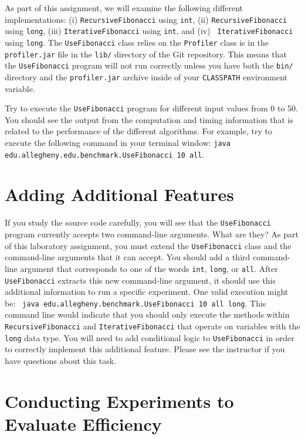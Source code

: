 \begin{sloppypar}
As part of this assignment, we will examine the following different implementations: (i) {\tt RecursiveFibonacci} using
{\tt int}, (ii) {\tt RecursiveFibonacci} using {\tt long}, (iii) {\tt IterativeFibonacci} using {\tt int}, and (iv) {\tt
  IterativeFibonacci} using {\tt long}. The {\tt UseFibonacci} class relies on the {\tt Profiler} class is in the {\tt
  profiler.jar} file in the {\tt lib/} directory of the Git repository.  This means that the {\tt UseFibonacci} program
will not run correctly unless you have both the {\tt bin/} directory and the {\tt profiler.jar} archive inside of your
{\tt CLASSPATH} environment variable.
\end{sloppypar}

Try to execute the {\tt UseFibonacci} program for different input values from 0 to 50. You should see the output from
the computation and timing information that is related to the performance of the different algorithms. For example, try
to execute the following command in your terminal window: {\tt java edu.allegheny.edu.benchmark.UseFibonacci 10 all}.

\section*{Adding Additional Features}

  If you study the source code carefully, you will see that the {\tt UseFibonacci} program currently accepts two
  command-line arguments. What are they? As part of this laboratory assignment, you must extend the {\tt UseFibonacci}
  class and the command-line arguments that it can accept. You should add a third command-line argument that corresponds
  to one of the words {\tt int}, {\tt long}, or {\tt all}. After {\tt UseFibonacci} extracts this new command-line
  argument, it should use this additional information to run a specific experiment. One valid execution might be: {\tt
    java edu.allegheny.benchmark.Use\-Fibonacci 10 all long}. This command line would indicate that you should only
  execute the methods within {\tt RecursiveFibonacci} and {\tt IterativeFibonacci} that operate on variables with the
  {\tt long} data type.  You will need to add conditional logic to {\tt UseFibonacci} in order to correctly
  implement this additional feature. Please see the instructor if you have questions about this task.

\section*{Conducting Experiments to Evaluate Efficiency}

